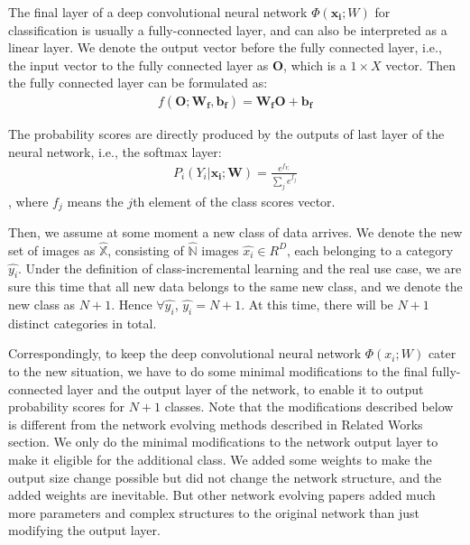The final layer of a deep convolutional neural network $\Phi(\mathbf{x_i}; W)$ for classification is usually a fully-connected layer, and can also be interpreted as a linear layer. We denote the output vector before the fully connected layer, i.e., the input vector to the fully connected layer as $\mathbf{O}$, which is a $1 \times X$ vector. Then the fully connected layer can be formulated as:
\begin{align}
f(\mathbf{O}; \mathbf{W_f}, \mathbf{b_f}) =  \mathbf{W_f}\mathbf{O} + \mathbf{b_f}
\end{align}

The probability scores are directly produced by the outputs of last layer of the neural network, i.e., the softmax layer:
\begin{align}
P_i(Y_i|\mathbf{x_i};\mathbf{W}) = \frac{e^{f_{Y_i}}}{\sum_j e^{f_j}}
\end{align}, where $f_j$ means the $j$th element of the class scores vector.

Then, we assume at some moment a new class of data arrives. We denote the new set of images as $\hat{\mathbb{X}}$, consisting of $\hat{\mathbb{N}}$ images $\hat{x_i} \in R^D$, each belonging to a category $\hat{y_i}$. Under the definition of class-incremental learning and the real use case, we are sure this time that all new data belongs to the same new class, and we denote the new class as $N+1$. Hence $\forall \hat{y_i}$, $\hat{y_i}=N+1$. At this time, there will be $N+1$ distinct categories in total. 

Correspondingly, to keep the deep convolutional neural network $\Phi(x_i; W)$ cater to the new situation, we have to do some minimal modifications to the final fully-connected layer and the output layer of the network, to enable it to output probability scores for $N+1$ classes. Note that the modifications described below is different from the network evolving methods described in Related Works section. We only do the minimal modifications to the network output layer to make it eligible for the additional class. We added some weights to make the output size change possible but did not change the network structure, and the added weights are inevitable. But other network evolving papers added much more parameters and complex structures to the original network than just modifying the output layer.

